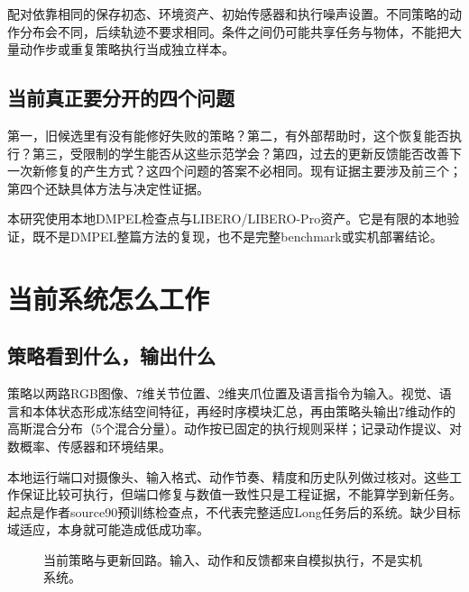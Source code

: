 \documentclass[UTF8,a4paper,fontset=none,zihao=-4]{ctexart}
\begin{document}
配对依靠相同的保存初态、环境资产、初始传感器和执行噪声设置。不同策略的动作分布会不同，后续轨迹不要求相同。条件之间仍可能共享任务与物体，不能把大量动作步或重复策略执行当成独立样本。
\subsection{当前真正要分开的四个问题}
第一，旧候选里有没有能修好失败的策略？第二，有外部帮助时，这个恢复能否执行？第三，受限制的学生能否从这些示范学会？第四，过去的更新反馈能否改善下一次新修复的产生方式？这四个问题的答案不必相同。现有证据主要涉及前三个；第四个还缺具体方法与决定性证据。

本研究使用本地DMPEL检查点与LIBERO/\allowbreak LIBERO-Pro资产\citep{dmpel,libero,liberopro}。它是有限的本地验证，既不是DMPEL整篇方法的复现，也不是完整benchmark或实机部署结论。
\section{当前系统怎么工作}
\subsection{策略看到什么，输出什么}
策略以两路RGB图像、7维关节位置、2维夹爪位置及语言指令为输入。视觉、语言和本体状态形成冻结空间特征，再经时序模块汇总，再由策略头输出7维动作的高斯混合分布（5个混合分量）。动作按已固定的执行规则采样；记录动作提议、对数概率、传感器和环境结果。

本地运行端口对摄像头、输入格式、动作节奏、精度和历史队列做过核对。这些工作保证比较可执行，但端口修复与数值一致性只是工程证据，不能算学到新任务。起点是作者source90预训练检查点，不代表完整适应Long任务后的系统。缺少目标域适应，本身就可能造成低成功率。
\par
\begin{figure}[htbp]
\centering
{}
\caption{当前策略与更新回路。输入、动作和反馈都来自模拟执行，不是实机系统。}
\end{figure}
\par
\end{document}
